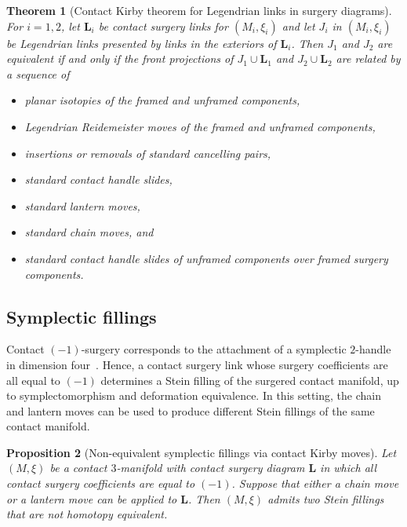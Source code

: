 \documentclass{amsart}
\numberwithin{equation}{section}
\numberwithin{figure}{section}
\newtheorem{theorem}{Theorem}[section]
\newtheorem{proposition}[theorem]{Proposition}
\theoremstyle{definition}
\theoremstyle{remark}
\let\olddxi\xi %
\renewcommand{\xi}{\olddxi}
\begin{document}
\begin{theorem}[Contact Kirby theorem for Legendrian links in surgery diagrams]\label{prop:Leg_links_Kirby_thm}
For $i=1,2$, let \(\boldsymbol L_i\) be contact surgery links for $(M_i,\xi_i)$ and let \(J_i\) in $(M_i,\xi_i)$ be Legendrian links presented by links in the exteriors of \(\boldsymbol L_i\). Then \(J_1\) and \(J_2\) are equivalent if and only if the front projections of $J_1\cup\boldsymbol L_1$ and $J_2\cup\boldsymbol L_2$ are related by a sequence of 
\begin{itemize}
    \item planar isotopies of the framed and unframed components,
    \item Legendrian Reidemeister moves of the framed and unframed components,
    \item insertions or removals of standard cancelling pairs,
    \item standard contact handle slides,
    \item standard lantern moves,
    \item standard chain moves, and
    \item standard contact handle slides of unframed components over framed surgery components.
\end{itemize}
\end{theorem}

\subsection{Symplectic fillings}

Contact \((-1)\)-surgery corresponds to the attachment of a symplectic \(2\)-handle in dimension four~\cite{Eliashberg_handle,Weinstein}. Hence, a contact surgery link whose surgery coefficients are all equal to \((-1)\) determines a Stein filling of the surgered contact manifold, up to symplectomorphism and deformation equivalence. In this setting, the chain and lantern moves can be used to produce different Stein fillings of the same contact manifold.

\begin{proposition}[Non-equivalent symplectic fillings via contact Kirby moves]
    Let \((M,\xi)\) be a contact \(3\)-manifold with contact surgery diagram \(\boldsymbol L\) in which all contact surgery coefficients are equal to \((-1)\). Suppose that either a chain move or a lantern move can be applied to \(\boldsymbol L\). Then \((M,\xi)\) admits two Stein fillings that are not homotopy equivalent.
\end{proposition}
    
\end{document}
